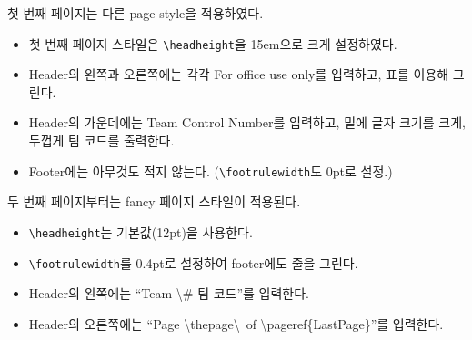 \documentclass[12pt]{article}
\begin{document}
	\thispagestyle{firstpage}
	첫 번째 페이지는 다른 page style을 적용하였다.	
	\begin{itemize}
		\item 첫 번째 페이지 스타일은 \texttt{\textbackslash headheight}을 15em으로 크게 설정하였다.
		\item Header의 왼쪽과 오른쪽에는 각각 For office use only를 입력하고, 표를 이용해 그린다.
		\item Header의 가운데에는 Team Control Number를 입력하고, 밑에 글자 크기를 크게, 두껍게 팀 코드를 출력한다.
		\item Footer에는 아무것도 적지 않는다. (\texttt{\textbackslash footrulewidth}도 0pt로 설정.)
	\end{itemize}
	\newpage
	두 번째 페이지부터는 fancy 페이지 스타일이 적용된다.
	\begin{itemize}
		\item \texttt{\textbackslash headheight}는 기본값(12pt)을 사용한다.
		\item \texttt{\textbackslash footrulewidth}를 0.4pt로 설정하여 footer에도 줄을 그린다.
		\item Header의 왼쪽에는 ``Team \textbackslash \# 팀 코드''를 입력한다.
		\item Header의 오른쪽에는 ``Page \textbackslash thepage\textbackslash\ of \textbackslash pageref\{LastPage\}''를 입력한다.
	\end{itemize}
\end{document}
